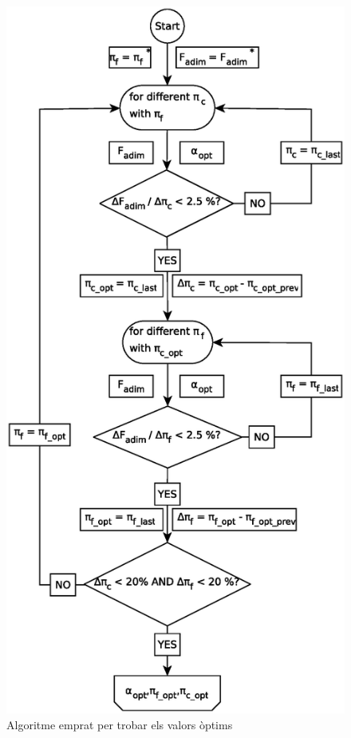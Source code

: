 \begin{figure}[H]
	\centering
	\includegraphics[scale=0.6]{./pics/optimization.eps}
	\caption{Algoritme emprat per trobar els valors òptims}
	\label{opt}
\end{figure}
